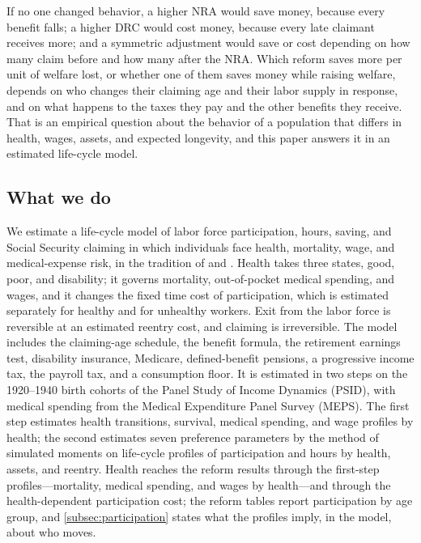 If no one changed behavior, a higher NRA would save money, because every benefit falls; a higher DRC would cost money, because every late claimant receives more; and a symmetric adjustment would save or cost depending on how many claim before and how many after the NRA. Which reform saves more per unit of welfare lost, or whether one of them saves money while raising welfare, depends on who changes their claiming age and their labor supply in response, and on what happens to the taxes they pay and the other benefits they receive. That is an empirical question about the behavior of a population that differs in health, wages, assets, and expected longevity, and this paper answers it in an estimated life-cycle model.

\subsection{What we do}\label{subsec:whatwedo}

We estimate a life-cycle model of labor force participation, hours, saving, and Social Security claiming in which individuals face health, mortality, wage, and medical-expense risk, in the tradition of \citet{french2005effects} and \citet{french2011effects}. Health takes three states, good, poor, and disability; it governs mortality, out-of-pocket medical spending, and wages, and it changes the fixed time cost of participation, which is estimated separately for healthy and for unhealthy workers. Exit from the labor force is reversible at an estimated reentry cost, and claiming is irreversible. The model includes the claiming-age schedule, the benefit formula, the retirement earnings test, disability insurance, Medicare, defined-benefit pensions, a progressive income tax, the payroll tax, and a consumption floor. It is estimated in two steps on the 1920--1940 birth cohorts of the Panel Study of Income Dynamics (PSID), with medical spending from the Medical Expenditure Panel Survey (MEPS). The first step estimates health transitions, survival, medical spending, and wage profiles by health; the second estimates seven preference parameters by the method of simulated moments on life-cycle profiles of participation and hours by health, assets, and reentry. Health reaches the reform results through the first-step profiles---mortality, medical spending, and wages by health---and through the health-dependent participation cost; the reform tables report participation by age group, and \autoref{subsec:participation} states what the profiles imply, in the model, about who moves. %

